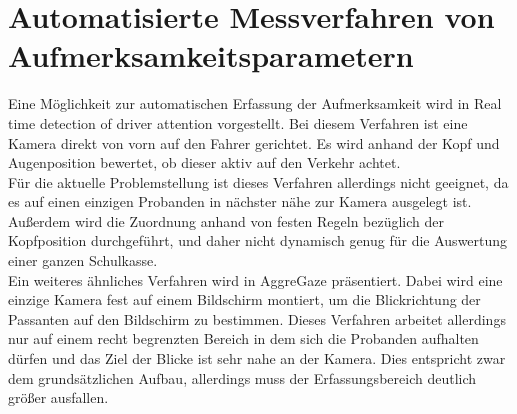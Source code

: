 \section{Automatisierte Messverfahren von Aufmerksamkeitsparametern}
\label{other_Messverfahren}
Eine Möglichkeit zur automatischen Erfassung der Aufmerksamkeit wird in \glqq Real time detection of driver attention\grqq\cite{driverAttention} vorgestellt. Bei diesem Verfahren ist eine Kamera direkt von vorn auf den Fahrer gerichtet. Es wird anhand der Kopf und Augenposition bewertet, ob dieser aktiv auf den Verkehr achtet.\\
Für die aktuelle Problemstellung ist dieses Verfahren allerdings nicht geeignet, da es auf einen einzigen Probanden in nächster nähe zur Kamera ausgelegt ist. Außerdem wird die Zuordnung anhand von festen Regeln bezüglich der Kopfposition durchgeführt, und daher nicht dynamisch genug für die Auswertung einer ganzen Schulkasse.\\ 
Ein weiteres ähnliches Verfahren wird in \glqq AggreGaze\grqq \cite{AggreGaze} präsentiert. Dabei wird eine einzige Kamera fest auf einem Bildschirm montiert, um die Blickrichtung der Passanten auf den Bildschirm zu bestimmen. Dieses Verfahren arbeitet allerdings nur auf einem recht begrenzten Bereich in dem sich die Probanden aufhalten dürfen und das Ziel der Blicke ist sehr nahe an der Kamera. Dies entspricht zwar dem grundsätzlichen Aufbau, allerdings muss der Erfassungsbereich deutlich größer ausfallen.